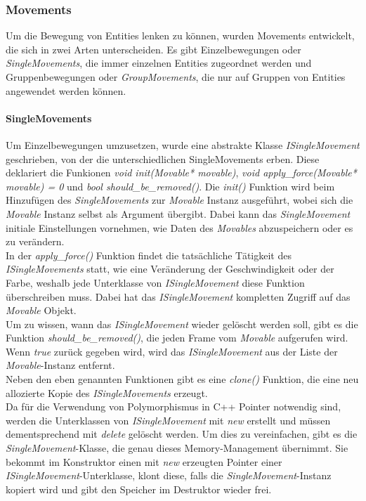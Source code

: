 \documentclass[11pt,a4paper]{article}
\begin{document}
\subsubsection{Movements}
Um die Bewegung von Entities lenken zu können, wurden Movements entwickelt, die sich in zwei Arten unterscheiden. Es gibt Einzelbewegungen oder \textit{SingleMovements}, die immer einzelnen Entities zugeordnet werden und Gruppenbewegungen oder \mbox{\textit{GroupMovements}}, die nur auf Gruppen von Entities angewendet werden können.

\paragraph{SingleMovements}
Um Einzelbewegungen umzusetzen, wurde eine abstrakte Klasse \textit{ISingleMovement} geschrieben, von der die unterschiedlichen SingleMovements erben. Diese deklariert die Funkionen \textit{void init(Movable* movable)}, \textit{void apply\_force(Movable* movable) = 0} und \textit{bool should\_be\_removed()}. Die \textit{init()} Funktion wird beim Hinzufügen des \textit{SingleMovements} zur \textit{Movable} Instanz ausgeführt, wobei sich die \textit{Movable} Instanz selbst als Argument übergibt. Dabei kann das \textit{SingleMovement} initiale Einstellungen vornehmen, wie Daten des \textit{Movables} abzuspeichern oder es zu verändern.\\
In der \textit{apply\_force()} Funktion findet die tatsächliche Tätigkeit des \textit{ISingleMovements} statt, wie eine Veränderung der Geschwindigkeit oder der Farbe, weshalb jede Unterklasse von \textit{ISingleMovement} diese Funktion überschreiben muss. Dabei hat das \textit{ISingleMovement} kompletten Zugriff auf das \textit{Movable} Objekt.\\
Um zu wissen, wann das \textit{ISingleMovement} wieder gelöscht werden soll, gibt es die Funktion \textit{should\_be\_removed()}, die jeden Frame vom \textit{Movable} aufgerufen wird. Wenn \textit{true} zurück gegeben wird, wird das \textit{ISingleMovement} aus der Liste der \textit{Movable}-Instanz entfernt.\\
Neben den eben genannten Funktionen gibt es eine \textit{clone()} Funktion, die eine neu allozierte Kopie des \textit{ISingleMovements} erzeugt.\\
Da für die Verwendung von Polymorphismus in C++ Pointer notwendig sind, werden die Unterklassen von \textit{ISingleMovement} mit \textit{new} erstellt und müssen dementsprechend mit \textit{delete} gelöscht werden. Um dies zu vereinfachen, gibt es die \textit{SingleMovement}-Klasse, die genau dieses Memory-Management übernimmt. Sie bekommt im Konstruktor einen mit \textit{new} erzeugten Pointer einer \textit{ISingleMovement}-Unterklasse, klont diese, falls die \textit{SingleMovement}-Instanz kopiert wird und gibt den Speicher im Destruktor wieder frei.
\end{document}
